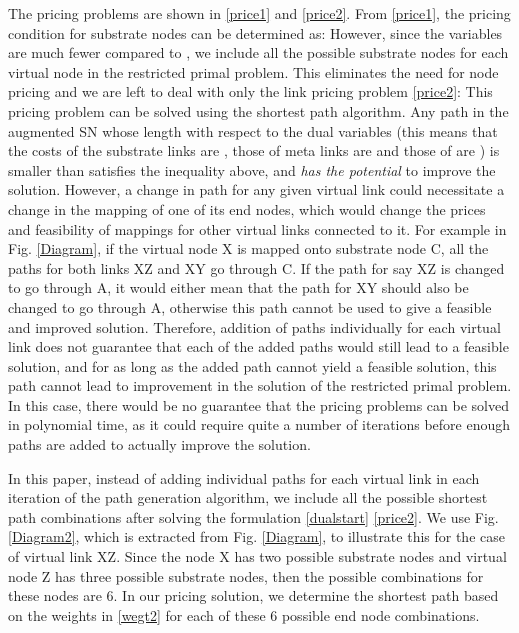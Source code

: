 \documentclass[journal]{IEEEtran}
\begin{document}
The pricing problems are shown in \eqref{price1} and \eqref{price2}. From \eqref{price1}, the pricing condition for substrate nodes can be determined as: 
 However, since the variables  are much fewer compared to , we include all the possible substrate nodes for each virtual node in the restricted primal problem. This eliminates the need for node pricing and we are left to deal with only the link pricing problem \eqref{price2}: 
This pricing problem can be solved using the shortest path algorithm. Any path  in the augmented \ac{SN} whose length with respect to the dual variables (this means that the costs of the substrate links  are , those of meta links  are  and those of  are ) is smaller than  satisfies the inequality above, and \emph{has the potential} to improve the solution.
However, a change in path for any given virtual link could necessitate a change in the mapping of one of its end nodes, which would change the prices and feasibility of mappings for other virtual links connected to it. For example in Fig. \ref{Diagram}, if the virtual node X is mapped onto substrate node C, all the paths for both links XZ and XY go through C. If the path for say XZ is changed to go through A, it would either mean that the path for XY should also be changed to go through A, otherwise this path cannot be used to give a feasible and improved solution. Therefore, addition of paths individually for each virtual link does not guarantee that each of the added paths would still lead to a feasible solution, and for as long as the added path cannot yield a feasible solution, this path cannot lead to improvement in the solution of the restricted primal problem. In this case, there would be no guarantee that the pricing problems can be solved in polynomial time, as it could require quite a number of iterations before enough paths are added to actually improve the solution.

In this paper, instead of adding individual paths for each virtual link in each iteration of the path generation algorithm, we include all the possible shortest path combinations after solving the formulation \eqref{dualstart}  \eqref{price2}. We use Fig. \ref{Diagram2}, which is extracted from Fig. \ref{Diagram}, to illustrate this for the case of virtual link XZ. Since the node X has two possible substrate nodes and virtual node Z has three possible substrate nodes, then the possible combinations for these nodes are 6. In our pricing solution, we determine the shortest path  based on the weights in \eqref{wegt2} for each of these 6 possible end node combinations.
\end{document}
